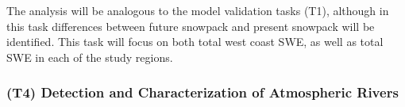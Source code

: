 \documentclass[11pt]{article}
\begin{document}
The analysis will be analogous to the model validation tasks (T1), although in this task differences between future snowpack and present snowpack will be identified.  This task will focus on both total west coast SWE, as well as total SWE in each of the study regions.




\subsubsection{(T4) Detection and Characterization of Atmospheric Rivers}
\end{document}
